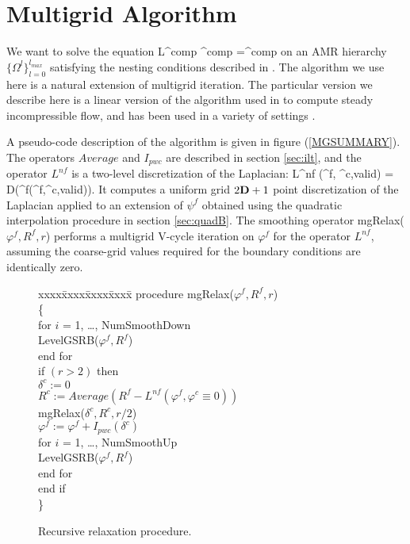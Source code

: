 \section{Multigrid Algorithm}
\label{MGSEC}

We want to solve the equation 
\beqa 
L^{comp} \varphi^{comp} =\rho^{comp}  \label{eqn:ellipticEqn}
\eeqa 
on an AMR hierarchy $\{ \Omega^l \}^{l_{max}}_{l=0}$
satisfying the nesting conditions described in
\cite{bergerColella:1989}.  The algorithm we use here is a natural
extension of multigrid iteration. The particular version we describe
here \cite{martcart,martthesis} is a linear version of the algorithm
used in \cite{thompsonFerziger:1989} to compute steady incompressible
flow, and has been used in a variety of settings
\cite{almgrenButtkeColella:1994, 
      almgrenETAL:1998,
      bettencourt:phdthesis,
      colellaDorrWake:1999b}.

A pseudo-code description of the algorithm is given in 
figure (\ref{MGSUMMARY}).  The
operators $Average$ and $I_{pwc}$ are described in section \ref{sec:ilt}, and
the operator $L^{nf}$ is a two-level discretization of the Laplacian:
\beqa
L^{nf} (\psi^f, \psi^{c,valid}) = D(^f(\psi^f,\psi^{c,valid})).
\eeqa
It computes a uniform grid $2 {\mathbf{D}} +1$ point discretization of the
Laplacian applied to an extension of $\psi^f$ obtained using the
quadratic interpolation procedure in section \ref{sec:quadB}. 
The smoothing operator mgRelax($\varphi^f, R^f, r$) performs a multigrid
V-cycle iteration on $\varphi^f$ for the operator $L^{nf}$, assuming the
coarse-grid values required for the boundary conditions are
identically zero.

\begin{figure}[thp]
\hrulefill
\begin{tabbing} 
xxxx\=xxxx\=xxxx\=xxxx\=\kill
\>procedure mgRelax($\varphi^f, R^f, r$) \\
\>\{ \\
\>\> for $i$ = 1, \ldots, NumSmoothDown \\
\>\>\> LevelGSRB($ \varphi^f, R^f$) \\
\>\> end for \\
\>\>if $(r > 2)$ then \\
\>\>\>$\delta^c := 0$ \\
\>\>\>$R^c := Average(R^f - L^{nf}(\varphi^f, \varphi^c \equiv 0))$ \\
\>\>\>mgRelax($\delta^c, R^c, r/2$) \\
\>\>\>$\varphi^f := \varphi^f + I_{pwc}(\delta^c)$ \\
\>\>\> for $i$ = 1, \ldots, NumSmoothUp \\
\>\>\>\> LevelGSRB($ \varphi^f, R^f$) \\
\>\>\> end for \\
\>\>end if \\
\>\}
\end{tabbing}
\caption{Recursive relaxation procedure.}
\label{mgRelax}
\hrulefill
\end{figure}

